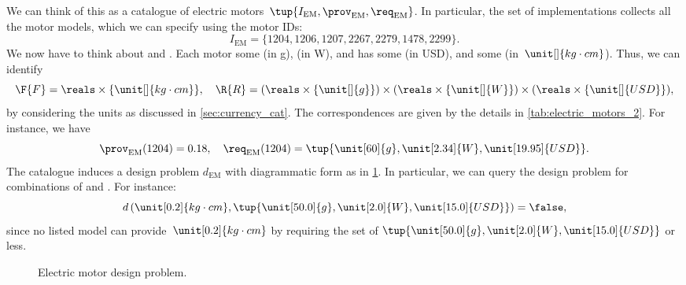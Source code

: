 \begin{example}
  We can think of this as a catalogue of electric motors~$\tup{I_\mathrm{EM},\prov_\mathrm{EM},\req_\mathrm{EM}}$. In particular, the set of implementations collects all the motor models, which we can specify using the motor IDs:
  \begin{equation}
    I_\mathrm{EM}=\{1204,1206,1207,2267,2279,1478,2299 \}.
  \end{equation}
  We now have to think about  and . Each motor  some  (in \unit[]{g}),  (in \unit[]{W}), and has some  (in USD), and  some  (in~$\unit[]{kg\cdot cm}$). Thus, we can identify
  \begin{equation*}
    \F{F}=\reals\times \{\unit[]{kg\cdot cm}\},\quad \R{R}=(\reals\times \{\unit[]{g}\})\times (\reals\times \{\unit[]{W}\})\times (\reals\times \{\unit[]{USD}\}),
  \end{equation*}
  by considering the units as discussed in \cref{sec:currency_cat}. The correspondences are given by the details in \cref{tab:electric_motors_2}. For instance, we have
  \begin{equation}
    \prov_\mathrm{EM}(1204)=0.18, \quad \req_\mathrm{EM}(1204)=\tup{\unit[60]{g},\unit[2.34]{W},\unit[19.95]{USD}}.
  \end{equation}
  The catalogue induces a design problem $d_\mathrm{EM}$ with diagrammatic form as in \cref{fig:dp_em}. In particular, we can query the design problem for combinations of  and . For instance:
  \begin{equation}
    d\left(\unit[0.2]{kg\cdot cm}, \tup{\unit[50.0]{g},\unit[2.0]{W},\unit[15.0]{USD}} \right)=\false,
  \end{equation}
  since no listed model can provide~$\unit[0.2]{kg\cdot cm}$  by requiring the set of  $\tup{\unit[50.0]{g},\unit[2.0]{W},\unit[15.0]{USD}}$ or less.

  \begin{figure}[tbh]
    \begin{center}
    \end{center}
    \caption{Electric motor design problem.}\label{fig:dp_em}
  \end{figure}


\end{example}
